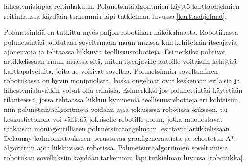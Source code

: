 lähestymistapaa reitinhakuun. Polunetsintäalgoritmien käyttö karttaohjelmien 
reitinhaussa käydään tarkemmin läpi tutkielman luvussa 
\ref{karttaohjelmat}.\par
	Polunetsintää on tutkittu myös paljon robotiikan näkökulmasta. 
Robotiikassa polunetsintää joudutaan soveltamaan muun muassa kun 
kehitetään itseajavia ajoneuvoja ja tehtaassa liikkuvia 
teollisuusrobotteja\cite{arXivMAPF}. Esimerkiksi \textcite{Lanelet2} 
pohtivat artikkelissaan muun muassa sitä, miten itseajaville autoille 
voitaisiin kehittää karttapalveluita, joita ne voisivat soveltaa. 
Polunetsinnän soveltaminen robotiikassa on hyvin monipuolista, koska 
ongelmat ovat keskenään erilaisia ja lähestymistavatkin voivat olla 
erilaisia. Esimerkiksi jos polunetsintää käytetään tilanteessa, jossa 
tehtaassa liikkuu kymmeniä teollisuusrobotteja eri kohteisiin, niin 
polunetsintäalgoritmeja voidaan ajaa jokaisessa robotissa erikseen, tai 
keskustietokone voi välittää jokaiselle robotille polun, jotka muodostavat 
ratkaisun moniagentilliseen polunetsintäongelmaan. 
\textcite{DelaunayVoronoiAStar} esittävät artikkelissaan 
Delaunay-kolmiomittaukseen perustuvaa graafigeneraatiota ja tehostetun 
A*-algoritmin ajoa liikkuvassa robotissa. Polunetsintäalgoritmien 
soveltamista robotiikan sovelluksiin käydään tarkemmin läpi tutkielman 
luvussa \ref{robotiikka}.

